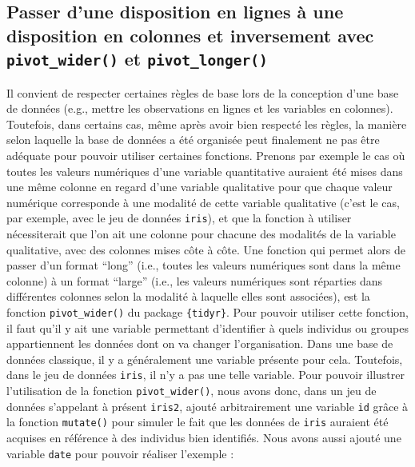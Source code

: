 \documentclass[
  letterpaper,
]{book}
\begin{document}
\subsection{\texorpdfstring{Passer d'une disposition en lignes à une
disposition en colonnes et inversement avec \texttt{pivot\_wider()} et
\texttt{pivot\_longer()}}{Passer d'une disposition en lignes à une disposition en colonnes et inversement avec pivot\_wider() et pivot\_longer()}}\label{passer-dune-disposition-en-lignes-uxe0-une-disposition-en-colonnes-et-inversement-avec-pivot_wider-et-pivot_longer}

Il convient de respecter certaines règles de base lors de la conception
d'une base de données (e.g., mettre les observations en lignes et les
variables en colonnes). Toutefois, dans certains cas, même après avoir
bien respecté les règles, la manière selon laquelle la base de données a
été organisée peut finalement ne pas être adéquate pour pouvoir utiliser
certaines fonctions. Prenons par exemple le cas où toutes les valeurs
numériques d'une variable quantitative auraient été mises dans une même
colonne en regard d'une variable qualitative pour que chaque valeur
numérique corresponde à une modalité de cette variable qualitative
(c'est le cas, par exemple, avec le jeu de données \texttt{iris}), et
que la fonction à utiliser nécessiterait que l'on ait une colonne pour
chacune des modalités de la variable qualitative, avec des colonnes
mises côte à côte. Une fonction qui permet alors de passer d'un format
``long'' (i.e., toutes les valeurs numériques sont dans la même colonne)
à un format ``large'' (i.e., les valeurs numériques sont réparties dans
différentes colonnes selon la modalité à laquelle elles sont associées),
est la fonction \texttt{pivot\_wider()} du package \texttt{\{tidyr\}}.
Pour pouvoir utiliser cette fonction, il faut qu'il y ait une variable
permettant d'identifier à quels individus ou groupes appartiennent les
données dont on va changer l'organisation. Dans une base de données
classique, il y a généralement une variable présente pour cela.
Toutefois, dans le jeu de données \texttt{iris}, il n'y a pas une telle
variable. Pour pouvoir illustrer l'utilisation de la fonction
\texttt{pivot\_wider()}, nous avons donc, dans un jeu de données
s'appelant à présent \texttt{iris2}, ajouté arbitrairement une variable
\texttt{id} grâce à la fonction \texttt{mutate()} pour simuler le fait
que les données de \texttt{iris} auraient été acquises en référence à
des individus bien identifiés. Nous avons aussi ajouté une variable
\texttt{date} pour pouvoir réaliser l'exemple :
\end{document}
